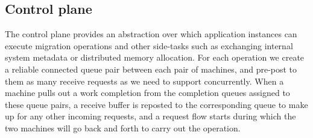 \subsection{Control plane}
The control plane provides an abstraction over which application instances can
execute migration operations and other side-tasks such as exchanging internal
system metadata or distributed memory allocation. For each operation we create
a reliable connected queue pair between each pair of machines, and pre-post to
them as many receive requests as we need to support concurrently. When a
machine pulls out a work completion from the completion queues assigned to
these queue pairs, a receive buffer is reposted to the corresponding queue to
make up for any other incoming requests, and a request flow starts during which
the two machines will go back and forth to carry out the operation.






